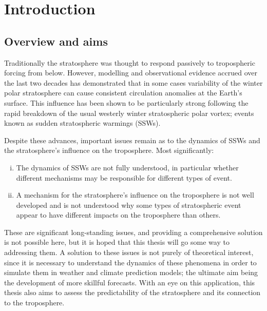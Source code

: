 \chapter{Introduction}
\label{cha:intro}

\section{Overview and aims}


Traditionally the stratosphere was thought to respond passively to tropospheric
forcing from below. However, modelling and observational evidence accrued over
the last two decades has demonstrated that in some cases variability of the
winter polar stratosphere can cause consistent circulation anomalies at the
Earth's surface. This influence has been shown to be particularly strong
following the rapid breakdown of the usual westerly winter stratospheric polar
vortex; events known as sudden stratospheric warmings (SSWs).

Despite these advances, important issues remain as to the dynamics of SSWs
and the stratosphere's influence on the troposphere. Most significantly:
\begin{enumerate}[i.]
\item The dynamics of SSWs are not fully understood, in particular whether
  different mechanisms may be responsible for different types of event.
\item A mechanism for the stratosphere's influence on the troposphere is not
  well developed and is not understood why some types of stratospheric event
  appear to have different impacts on the troposphere than others.
\end{enumerate}
These are significant long-standing issues, and providing a comprehensive
solution is not possible here, but it is hoped that this thesis will go some way
to addressing them. A solution to these issues is not purely of theoretical
interest, since it is necessary to understand the dynamics of these phenomena in
order to simulate them in weather and climate prediction models; the ultimate
aim being the development of more skillful forecasts. With an eye on this
application, this thesis also aims to assess the predictability of the
stratosphere and its connection to the troposphere.

